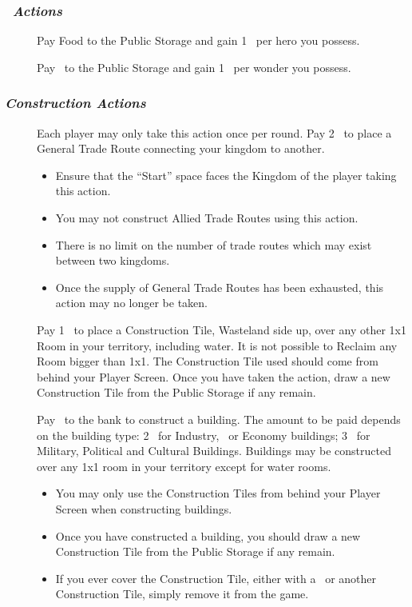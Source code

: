 \documentclass[10pt,twocolumn]{article}
\begin{document}
\subsubsection*{\textit{\worship\ Actions}}
\begin{description}
\item[] Pay  Food to the Public Storage and gain 1 \vp\ per hero you possess.
\item[] Pay  \minerals\ to the Public Storage and gain 1 \vp\ per wonder you possess.
\end{description}

\subsubsection*{\textit{Construction Actions}}
\begin{description}
\item[] Each player may only take this action once per round. Pay 2 \minerals\ to place a General Trade Route connecting your kingdom to another.
\begin{itemize}
\item Ensure that the ``Start'' space faces the Kingdom of the player taking this action.
\item You may not construct Allied Trade Routes using this action.
\item There is no limit on the number of trade routes which may exist between two kingdoms.
\item Once the supply of General Trade Routes has been exhausted, this action may no longer be taken.
\end{itemize}
\item[] Pay 1 \mineral\ to place a Construction Tile, Wasteland side up, over any other 1x1 Room in your territory, including water. It is not possible to Reclaim any Room bigger than 1x1. The Construction Tile used should come from behind your Player Screen. Once you have taken the action, draw a new Construction Tile from the Public Storage if any remain.
\item[] Pay \minerals\ to the bank to construct a building. The amount to be paid depends on the building type: 2 \minerals\ for Industry, \traffic\ or Economy buildings; 3 \minerals\ for Military, Political and Cultural Buildings. Buildings may be constructed over any 1x1 room in your territory except for water rooms.
\begin{itemize}
\item You may only use the Construction Tiles from behind your Player Screen when constructing buildings.
\item Once you have constructed a building, you should draw a new Construction Tile from the Public Storage if any remain.
\item If you ever cover the Construction Tile, either with a \landcard\ or another Construction Tile, simply remove it from the game.
\end{itemize}
\end{description}
\end{document}
